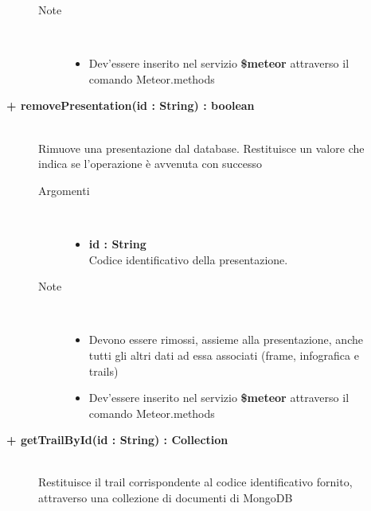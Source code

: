 \begin{description}
\begin{description}
\begin{description}
\begin{itemize}
				\end{itemize}
			\item[Note] \hfill \\
			\begin{itemize}
					\item Dev'essere inserito nel servizio \textbf{\$meteor} attraverso il comando Meteor.methods
				\end{itemize}
		\end{description}
	\end{description}
	
	\begin{description}
		\item[\textbf{\color{blue}+ removePresentation(id : String) : boolean			}] \hfill \\
			Rimuove una presentazione dal database. Restituisce un valore che indica se l'operazione è avvenuta con successo
			
		\begin{description}
			\item[Argomenti] \hfill \\
				\begin{itemize}
				
					\item \textbf{id : String			} \hfill \\
					Codice identificativo della presentazione.
					
				\end{itemize}
			\item[Note] \hfill \\
			\begin{itemize}
					\item Devono essere rimossi, assieme alla presentazione, anche tutti gli altri dati ad essa associati (frame, infografica e trails)
					\item Dev'essere inserito nel servizio \textbf{\$meteor} attraverso il comando Meteor.methods
				\end{itemize}
		\end{description}
	\end{description}
	
	\begin{description}
		\item[\textbf{\color{blue}+ getTrailById(id : String) : Collection			}] \hfill \\
			Restituisce il trail corrispondente al codice identificativo fornito, attraverso una collezione di documenti di MongoDB
			

\end{description}
\end{description}
